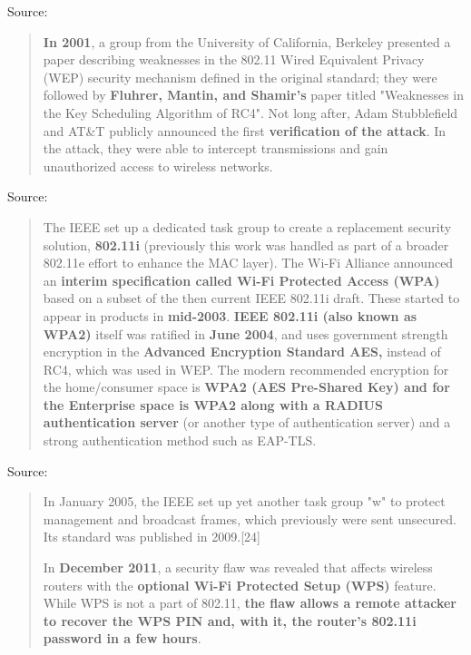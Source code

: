 \documentclass[Screen16to9,17pt]{foils}
\begin{document}
Source: 




\begin{quote}
{\bf In 2001}, a group from the University of California, Berkeley presented a paper describing weaknesses in the 802.11 Wired Equivalent Privacy (WEP) security mechanism defined in the original standard; they were followed by {\bf Fluhrer, Mantin, and Shamir's} paper titled "Weaknesses in the Key Scheduling Algorithm of RC4". Not long after, Adam Stubblefield and AT\&T publicly announced the first {\bf verification of the attack}. In the attack, they were able to intercept transmissions and gain unauthorized access to wireless networks.
\end{quote}
Source: 


\begin{quote}
The IEEE set up a dedicated task group to create a replacement security solution, {\bf 802.11i} (previously this work was handled as part of a broader 802.11e effort to enhance the MAC layer). The Wi-Fi Alliance announced an {\bf interim specification called Wi-Fi Protected Access (WPA)} based on a subset of the then current IEEE 802.11i draft. These started to appear in products in {\bf mid-2003}. {\bf IEEE 802.11i (also known as WPA2)} itself was ratified in {\bf June 2004}, and uses government strength encryption in the {\bf Advanced Encryption Standard AES,} instead of RC4, which was used in WEP. The modern recommended encryption for the home/consumer space is {\bf WPA2 (AES Pre-Shared Key) and for the Enterprise space is WPA2 along with a RADIUS authentication server} (or another type of authentication server) and a strong authentication method such as EAP-TLS.
\end{quote}
Source: 


\begin{quote}
In January 2005, the IEEE set up yet another task group "w" to protect management and broadcast frames, which previously were sent unsecured. Its standard was published in 2009.[24]

In {\bf December 2011}, a security flaw was revealed that affects wireless routers with the {\bf optional Wi-Fi Protected Setup (WPS)} feature. While WPS is not a part of 802.11, {\bf the flaw allows a remote attacker to recover the WPS PIN and, with it, the router's 802.11i password in a few hours}.
\end{quote}
\end{document}
